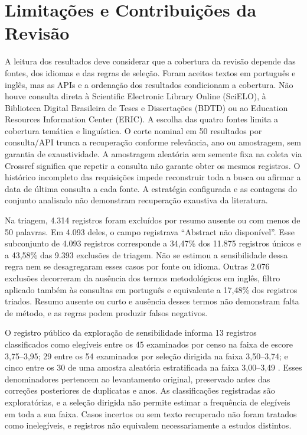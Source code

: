 \section{Limitações e Contribuições da Revisão}
\label{sec:limitacoes-revisao}

A leitura dos resultados deve considerar que a cobertura da revisão depende das fontes, dos idiomas e das regras de seleção. Foram aceitos textos em português e inglês, mas as APIs e a ordenação dos resultados condicionam a cobertura. Não houve consulta direta à Scientific Electronic Library Online (SciELO), à Biblioteca Digital Brasileira de Teses e Dissertações (BDTD) ou ao Education Resources Information Center (ERIC). A escolha das quatro fontes limita a cobertura temática e linguística. O corte nominal em 50 resultados por consulta/API trunca a recuperação conforme relevância, ano ou amostragem, sem garantia de exaustividade. A amostragem aleatória sem semente fixa na coleta via Crossref significa que repetir a consulta não garante obter os mesmos registros. O histórico incompleto das requisições impede reconstruir toda a busca ou afirmar a data de última consulta a cada fonte. A estratégia configurada e as contagens do conjunto analisado não demonstram recuperação exaustiva da literatura.

Na triagem, 4.314 registros foram excluídos por resumo ausente ou com menos de 50 palavras. Em 4.093 deles, o campo registrava ``Abstract não disponível''. Esse subconjunto de 4.093 registros corresponde a 34,47\% dos 11.875 registros únicos e a 43,58\% das 9.393 exclusões de triagem. Não se estimou a sensibilidade dessa regra nem se desagregaram esses casos por fonte ou idioma. Outras 2.076 exclusões decorreram da ausência dos termos metodológicos em inglês, filtro aplicado também às consultas em português e equivalente a 17,48\% dos registros triados. Resumo ausente ou curto e ausência desses termos não demonstram falta de método, e as regras podem produzir falsos negativos.

O registro público da exploração de sensibilidade informa 13 registros classificados como elegíveis entre os 45 examinados por censo na faixa de escore 3,75--3,95; 29 entre os 54 examinados por seleção dirigida na faixa 3,50--3,74; e cinco entre os 30 de uma amostra aleatória estratificada na faixa 3,00--3,49 \cite{BatistaCCWCode2026}. Esses denominadores pertencem ao levantamento original, preservado antes das correções posteriores de duplicatas e anos. As classificações registradas são exploratórias, e a seleção dirigida não permite estimar a frequência de elegíveis em toda a sua faixa. Casos incertos ou sem texto recuperado não foram tratados como inelegíveis, e registros não equivalem necessariamente a estudos distintos.

